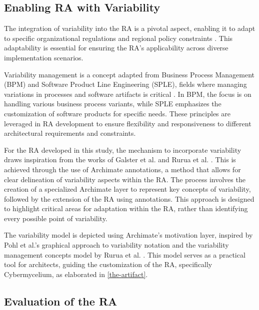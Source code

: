 \documentclass[review]{elsarticle}
\begin{document}
\subsection{Enabling RA with Variability}

The integration of variability into the RA is a pivotal aspect, enabling it to adapt to specific organizational regulations and regional policy constraints \cite{rurua2019representing}. This adaptability is essential for ensuring the RA's applicability across diverse implementation scenarios.

Variability management is a concept adapted from Business Process Management (BPM) and Software Product Line Engineering (SPLE), fields where managing variations in processes and software artifacts is critical \cite{la2009questionnaire, rosemann2007configurable, hallerbach2010capturing, pohl2005software, chen2011systematic, schmid2004customizable, svahnberg2005taxonomy, sinnema2006covamof}. In BPM, the focus is on handling various business process variants, while SPLE emphasizes the customization of software products for specific needs. These principles are leveraged in RA development to ensure flexibility and responsiveness to different architectural requirements and constraints.

For the RA developed in this study, the mechanism to incorporate variability draws inspiration from the works of Galster et al. \cite{galster2011empirically} and Rurua et al. \cite{rurua2019representing}. This is achieved through the use of Archimate annotations, a method that allows for clear delineation of variability aspects within the RA. The process involves the creation of a specialized Archimate layer to represent key concepts of variability, followed by the extension of the RA using annotations. This approach is designed to highlight critical areas for adaptation within the RA, rather than identifying every possible point of variability.

The variability model is depicted using Archimate's motivation layer, inspired by Pohl et al.'s graphical approach to variability notation \cite{pohl2005software} and the variability management concepts model by Rurua et al. \cite{rurua2019representing}. This model serves as a practical tool for architects, guiding the customization of the RA, specifically Cybermycelium, as elaborated in \ref{the-artifact}.


\subsection{Evaluation of the RA}
\end{document}
